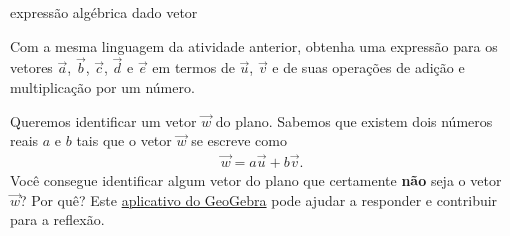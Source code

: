 \begin{task}{ expressão algébrica dado vetor}
\label{ativ-vetores-combinacao}



Com a mesma linguagem da atividade anterior, obtenha uma expressão para os vetores \(\vec{a}\), \(\vec{b}\), \(\vec{c}\), \(\vec{d}\) e \(\vec{e}\) em termos de \(\vec{u}\), \(\vec{v}\) e de suas operações de adição e multiplicação por um número.

\begin{center}
\end{center}
\end{task}


\begin{reflection}
Queremos identificar um vetor \(\vec{w}\) do plano. Sabemos que existem dois números reais \(a\) e \(b\) tais que o vetor \(\vec{w}\) se escreve como
\begin{equation*}
\begin{split}\vec{w} = a\vec{u} + b\vec{v}.\end{split}
\end{equation*}
Você consegue identificar algum vetor do plano que certamente \textbf{não} seja o vetor \(\vec{w}\)? Por quê? Este \href{https://www.geogebra.org/m/ZUgkeWXW}{aplicativo do GeoGebra} pode ajudar a responder e contribuir para a reflexão.
\end{reflection}



